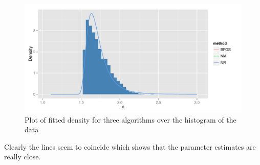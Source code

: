 \documentclass[12pt]{article}
\begin{document}
\begin{enumerate}[label=(\alph*)]
\begin{figure}[H]
\begin{centering}
\includegraphics{aua257HW3-002}
\caption{Plot of fitted density for three algorithms over the histogram of the data}
\end{centering}
\end{figure}
Clearly the lines seem to coincide which shows that the parameter estimates are really close.
\end{enumerate}

\end{document}
